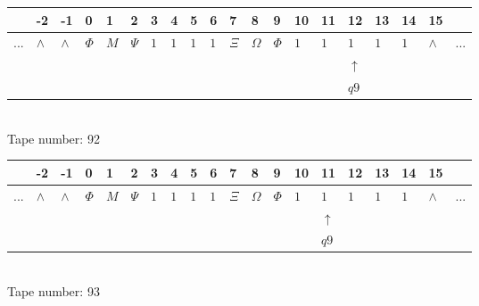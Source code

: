 \documentclass[11pt]{article}
\begin{document}
\begin{table}[H]
\centering
\begin{tabular}{llllllllllllllllllll}
 & -2 & -1 & 0 & 1 & 2 & 3 & 4 & 5 & 6 & 7 & 8 & 9 & 10 & 11 & 12 & 13 & 14 & 15 & \\
\hline
$...$ & \multicolumn{1}{|l|}{$\wedge$} & \multicolumn{1}{|l|}{$\wedge$} & \multicolumn{1}{|l|}{$\Phi$} & \multicolumn{1}{|l|}{$M$} & \multicolumn{1}{|l|}{$\Psi$} & \multicolumn{1}{|l|}{$1$} & \multicolumn{1}{|l|}{$1$} & \multicolumn{1}{|l|}{$1$} & \multicolumn{1}{|l|}{$1$} & \multicolumn{1}{|l|}{$\Xi$} & \multicolumn{1}{|l|}{$\Omega$} & \multicolumn{1}{|l|}{$\Phi$} & \multicolumn{1}{|l|}{$1$} & \multicolumn{1}{|l|}{$1$} & \multicolumn{1}{|l|}{$1$} & \multicolumn{1}{|l|}{$1$} & \multicolumn{1}{|l|}{$1$} & \multicolumn{1}{|l|}{$\wedge$} & $...$\\
\hline
&  &  &  &  &  &  &  &  &  &  &  &  &  &  & $\uparrow$ &  &  &  &  \\
&  &  &  &  &  &  &  &  &  &  &  &  &  &  & $ q9 $ &  &  &  &  \\
\end{tabular}
\\
Tape number: 92
\noindent\makebox[\linewidth]{\hdashrule{\textwidth}{1pt}{1pt}}\end{table}

\begin{table}[H]
\centering
\begin{tabular}{llllllllllllllllllll}
 & -2 & -1 & 0 & 1 & 2 & 3 & 4 & 5 & 6 & 7 & 8 & 9 & 10 & 11 & 12 & 13 & 14 & 15 & \\
\hline
$...$ & \multicolumn{1}{|l|}{$\wedge$} & \multicolumn{1}{|l|}{$\wedge$} & \multicolumn{1}{|l|}{$\Phi$} & \multicolumn{1}{|l|}{$M$} & \multicolumn{1}{|l|}{$\Psi$} & \multicolumn{1}{|l|}{$1$} & \multicolumn{1}{|l|}{$1$} & \multicolumn{1}{|l|}{$1$} & \multicolumn{1}{|l|}{$1$} & \multicolumn{1}{|l|}{$\Xi$} & \multicolumn{1}{|l|}{$\Omega$} & \multicolumn{1}{|l|}{$\Phi$} & \multicolumn{1}{|l|}{$1$} & \multicolumn{1}{|l|}{$1$} & \multicolumn{1}{|l|}{$1$} & \multicolumn{1}{|l|}{$1$} & \multicolumn{1}{|l|}{$1$} & \multicolumn{1}{|l|}{$\wedge$} & $...$\\
\hline
&  &  &  &  &  &  &  &  &  &  &  &  &  & $\uparrow$ &  &  &  &  &  \\
&  &  &  &  &  &  &  &  &  &  &  &  &  & $ q9 $ &  &  &  &  &  \\
\end{tabular}
\\
Tape number: 93
\noindent\makebox[\linewidth]{\hdashrule{\textwidth}{1pt}{1pt}}\end{table}
\end{document}
